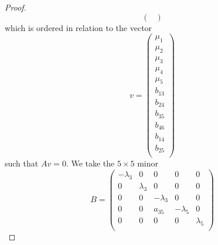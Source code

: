 \documentclass[12pt]{article}
\begin{document}
\begin{proof}
\[\begin{pmatrix}
\end{pmatrix}\]
which is ordered in relation to the vector \[
v=\begin{pmatrix}
\mu_1\\
\mu_2\\
\mu_3\\
\mu_4\\
\mu_5\\
b_{13}\\
b_{24}\\
b_{35}\\
b_{46}\\
b_{14}\\
b_{25}\\
\end{pmatrix}
\]
such that $Av=0$. We take the $5\times 5$ minor \[
B=\begin{pmatrix}
-\lambda_3 & 0 & 0 & 0 & 0\\
0 & \lambda_3 & 0 & 0 & 0\\
0 & 0 & -\lambda_3 & 0 & 0\\
0 & 0 & a_{35} & -\lambda_5 & 0\\
0 & 0 & 0 & 0 & \lambda_5\\
\end{pmatrix}
\]

\end{proof}
\end{document}
